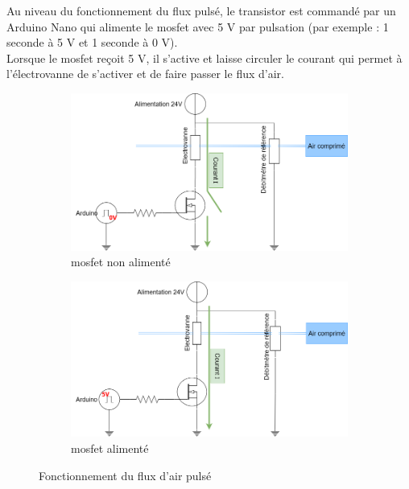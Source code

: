 Au niveau du fonctionnement du flux pulsé, le transistor est commandé par un Arduino Nano qui alimente le \gls{mosfet} avec 5 V par pulsation 
(par exemple : 1 seconde à 5 V et 1 seconde à 0 V). \\
Lorsque le \gls{mosfet} reçoit 5 V, il s'active et laisse circuler le courant qui permet à l'électrovanne de s'activer et de faire passer le
flux d'air.
\begin{figure}[H]
    \centering
    \begin{subfigure}[b]{0.45\textwidth}
        \hspace{-1.5cm}
        \includegraphics[scale = 0.3]{assets/figures/MOSFET_0V.png}
        \caption{\gls{mosfet} non alimenté}
        \label{fig:MOSFET_0V}
    \end{subfigure}
    \begin{subfigure}[b]{0.45\textwidth}
        \centering
        \includegraphics[scale = 0.3]{assets/figures/MOSFET_5V.png}
        \caption{\gls{mosfet} alimenté}
        \label{fig:MOSFET_5V}
    \end{subfigure}
    \caption{Fonctionnement du flux d'air pulsé}
    \label{fig:flux_pulse}
\end{figure}


